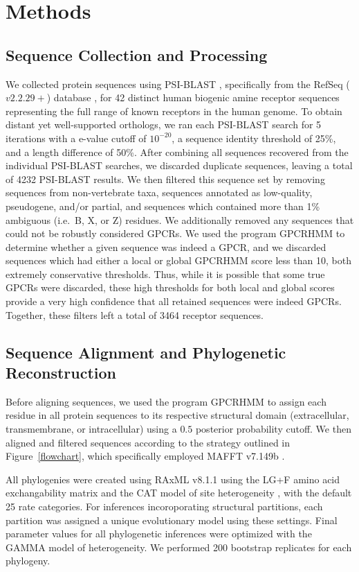\documentclass[fleqn,10pt]{wlpeerj}
\begin{document}
\section*{Methods}

\subsection*{Sequence Collection and Processing}
We collected protein sequences using PSI-BLAST \citep{psiblast}, specifically from the RefSeq ($v2.2.29+$) database \citep{refseq}, for 42 distinct human biogenic amine receptor sequences representing the full range of known receptors in the human genome. To obtain distant yet well-supported orthologs, we ran each PSI-BLAST search for 5 iterations with a e-value cutoff of $10^{-20}$, a sequence identity threshold of 25\%, and a length difference of 50\%. After combining all sequences recovered from the individual PSI-BLAST searches, we discarded duplicate sequences, leaving a total of 4232 PSI-BLAST results. We then filtered this sequence set by removing sequences from non-vertebrate taxa, sequences annotated as low-quality, pseudogene, and/or partial, and sequences which contained more than 1\% ambiguous (i.e.\ B, X, or Z) residues. We additionally removed any sequences that could not be robustly considered GPCRs. We used the program GPCRHMM \citep{Wistrand2006} to determine whether a given sequence was indeed a GPCR, and we discarded sequences which had either a local or global GPCRHMM score less than 10, both extremely conservative thresholds. Thus, while it is possible that some true GPCRs were discarded, these high thresholds for both local and global scores provide a very high confidence that all retained sequences were indeed GPCRs. Together, these filters left a total of 3464 receptor sequences.


\subsection*{Sequence Alignment and Phylogenetic Reconstruction}
Before aligning sequences, we used the program GPCRHMM \citep{Wistrand2006} to assign each residue in all protein sequences to its respective structural domain (extracellular, transmembrane, or intracellular) using a $0.5$ posterior probability cutoff. We then aligned and filtered sequences according to the strategy outlined in Figure~\ref{flowchart}, which specifically employed MAFFT v7.149b \cite{mafftv7}. 

All phylogenies were created using RAxML v8.1.1 \cite{raxml} using the LG+F \citep{LG} amino acid exchangability matrix and the CAT model of site heterogeneity \citep{Stamatakis2006}, with the default 25 rate categories. For inferences incoroporating structural partitions, each partition was assigned a unique evolutionary model using these settings. Final parameter values for all phylogenetic inferences were optimized with the GAMMA model of heterogeneity. We performed 200 bootstrap replicates for each phylogeny.
\end{document}

